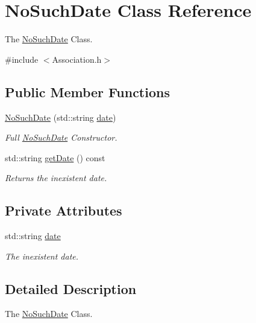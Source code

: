 \hypertarget{classNoSuchDate}{}\section{No\+Such\+Date Class Reference}
\label{classNoSuchDate}


The \hyperlink{classNoSuchDate}{No\+Such\+Date} Class.  




{\ttfamily \#include $<$Association.\+h$>$}

\subsection*{Public Member Functions}
\begin{DoxyCompactItemize}
\item 
\hyperlink{classNoSuchDate_a0cad1c9e0d0a034a885b2529d6f79811}{No\+Such\+Date} (std\+::string \hyperlink{classNoSuchDate_af3b260da65ff8089d325b948e895f6b3}{date})
\begin{DoxyCompactList}\small\item\em Full \hyperlink{classNoSuchDate}{No\+Such\+Date} Constructor. \end{DoxyCompactList}\item 
std\+::string \hyperlink{classNoSuchDate_ad78fefa7d990af927c46096722a00f2c}{get\+Date} () const
\begin{DoxyCompactList}\small\item\em Returns the inexistent date. \end{DoxyCompactList}\end{DoxyCompactItemize}
\subsection*{Private Attributes}
\begin{DoxyCompactItemize}
\item 
std\+::string \hyperlink{classNoSuchDate_af3b260da65ff8089d325b948e895f6b3}{date}
\begin{DoxyCompactList}\small\item\em The inexistent date. \end{DoxyCompactList}\end{DoxyCompactItemize}


\subsection{Detailed Description}
The \hyperlink{classNoSuchDate}{No\+Such\+Date} Class. 

